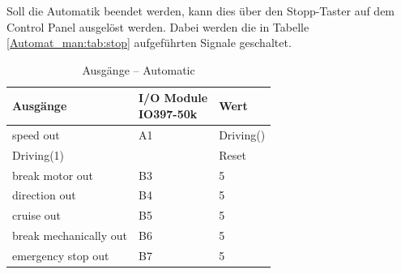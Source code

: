 Soll die Automatik beendet werden, kann dies über den Stopp-Taster auf dem Control Panel ausgelöst werden. Dabei werden die in Tabelle \ref{Automat_man:tab:stop} aufgeführten Signale geschaltet.

\pagebreak[1]
\begin{table}[!ht]
	\centering
	\caption{Ausgänge – Automatic}
	\label{Automat_man:tab:automatic}
	\begin{tabular}{lll}
		\hline
		\textbf{Ausgänge}                           & \makecell{\textbf{I/O Module}             \\ \textbf{IO397-50k}}                 & \textbf{Wert} \\ \hline
		\multicolumn{1}{l|}{speed out}              & \multicolumn{1}{l|}{A1}       & Driving() \\
		\multicolumn{1}{l|}{Driving(1)}             & \multicolumn{1}{l|}{}         & Reset     \\
		\multicolumn{1}{l|}{break motor out}        & \multicolumn{1}{l|}{B3}       & 5         \\
		\multicolumn{1}{l|}{direction out}          & \multicolumn{1}{l|}{B4}       & 5         \\
		\multicolumn{1}{l|}{cruise out}             & \multicolumn{1}{l|}{B5}       & 5         \\
		\multicolumn{1}{l|}{break mechanically out} & \multicolumn{1}{l|}{B6}       & 5         \\
		\multicolumn{1}{l|}{emergency stop out}     & \multicolumn{1}{l|}{B7}       & 5         \\ \hline
	\end{tabular}
\end{table}
\pagebreak[2]



